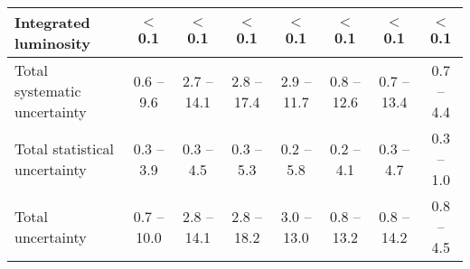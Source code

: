 \begin{landscape}
\begin{table}
{\begin{tabular}{lccccccc}
		Integrated luminosity	&	$<$0.1	&	$<$0.1	&	$<$0.1	&	$<$0.1	&	$<$0.1	&	$<$0.1	&	$<$0.1  \vspace*{0.1cm} \\ 
		\hline
		Total systematic uncertainty	&	0.6 -- 9.6	&	2.7 -- 14.1	&	2.8 -- 17.4	&	2.9 -- 11.7	&	0.8 -- 12.6	&	0.7 -- 13.4	&	0.7 -- 4.4\\ 
		Total statistical uncertainty	&	0.3 -- 3.9	&	0.3 -- 4.5	&	0.3 -- 5.3	&	0.2 -- 5.8	&	0.2 -- 4.1	&	0.3 -- 4.7	&	0.3 -- 1.0  \vspace*{0.1cm} \\ 
		\hline
		Total uncertainty	&	0.7 -- 10.0	&	2.8 -- 14.1	&	2.8 -- 18.2	&	3.0 -- 13.0	&	0.8 -- 13.2	&	0.8 -- 14.2	&	0.8 -- 4.5\\ 
	\end{tabular}%
	}
\end{table}
\end{landscape}
\clearpage

